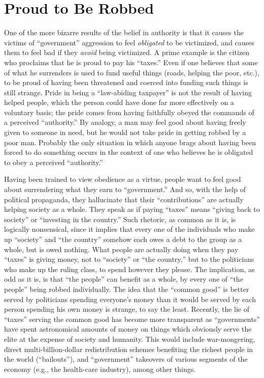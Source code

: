 \documentclass{book}
\begin{document}
\section{Proud to Be Robbed}

One of the more bizarre results of the belief in authority is that it causes the victims of \enquote{government} aggression to feel \emph{obligated} to be victimized, and causes them to feel bad if they \emph{avoid} being victimized. A prime example is the citizen who proclaims that he is proud to pay his \enquote{taxes.} Even if one believes that some of what he surrenders is used to fund useful things (roads, helping the poor, etc.), to be proud of having been threatened and coerced into funding such things is still strange. Pride in being a \enquote{law-abiding taxpayer} is not the result of having helped people, which the person could have done far more effectively on a voluntary basis; the pride comes from having faithfully obeyed the commands of a perceived \enquote{authority.} By analogy, a man may feel good about having freely given to someone in need, but he would not take pride in getting robbed by a poor man. Probably the only situation in which anyone brags about having been forced to do something occurs in the context of one who believes he is obligated to obey a perceived \enquote{authority.}

Having been trained to view obedience as a virtue, people want to feel good about surrendering what they earn to \enquote{government.} And so, with the help of political propaganda, they hallucinate that their \enquote{contributions} are actually helping society as a whole. They speak as if paying \enquote{taxes} means \enquote{giving back to society} or \enquote{investing in the country.} Such rhetoric, as common as it is, is logically nonsensical, since it implies that every one of the individuals who make up \enquote{society} and \enquote{the country} somehow each owes a debt to the group as a whole, but is owed nothing. What people are actually doing when they pay \enquote{taxes} is giving money, not to \enquote{society} or \enquote{the country,} but to the politicians who make up the ruling class, to spend however they please. The implication, as odd as it is, is that \enquote{the people} can benefit as a whole, by every one of \enquote{the people} being robbed individually. The idea that the \enquote{common good} is better served by politicians spending everyone's money than it would be served by each person spending his own money is strange, to say the least. Recently, the lie of \enquote{taxes} serving the common good has become more transparent as \enquote{governments} have spent astronomical amounts of money on things which obviously serve the elite at the expense of society and humanity. This would include war-mongering, direct multi-billion-dollar redistribution schemes benefiting the richest people in the world (\enquote{bailouts}), and \enquote{government} takeovers of various segments of the economy (e.g., the health-care industry), among other things.
\end{document}
